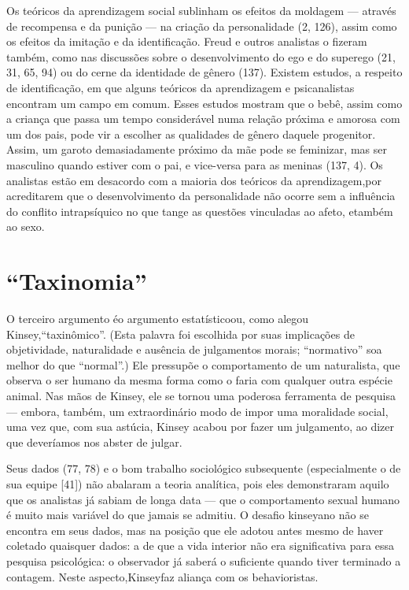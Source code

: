  Os teóricos da aprendizagem social sublinham os efeitos da moldagem ---
através de recompensa e da punição --- na criação da personalidade (2,
126), assim como os efeitos da imitação e da identificação.\idxident{} Freud e
outros analistas o fizeram também, como nas discussões sobre o
desenvolvimento do ego e do superego (21, 31, 65, 94) ou do cerne da
identidade de gênero\idxidencer{} (137). Existem estudos, a respeito de
identificação, em que alguns teóricos da aprendizagem e psicanalistas
encontram um campo em comum. Esses estudos mostram que o bebê, assim
como a criança que passa um tempo considerável numa relação próxima e
amorosa com um dos pais, pode vir a escolher as qualidades de gênero
daquele progenitor. Assim, um garoto demasiadamente próximo da mãe pode
se feminizar, mas ser masculino quando estiver com o pai, e vice-versa
para as meninas (137, 4). Os analistas estão em desacordo com a
maioria dos teóricos da aprendizagem,\idxaberrteor[|)] por acreditarem que o
desenvolvimento da personalidade não ocorre sem a influência do
conflito intrapsíquico no que tange as questões vinculadas ao afeto, e\idxsocia[|)]
também ao sexo.




\section{``Taxinomia''}

O terceiro argumento é\idxestat[|(] o argumento estatístico\idxaberrestat[|(] ou, como alegou
Kinsey,\idxkins[|(] ``taxinômico''. (Esta palavra foi escolhida por suas implicações
de objetividade, naturalidade e ausência de julgamentos morais;
``normativo'' soa melhor do que ``normal''.) Ele pressupõe o comportamento
de um naturalista, que observa o ser humano da mesma forma como o faria
com qualquer outra espécie animal. Nas mãos de Kinsey, ele se tornou
uma poderosa ferramenta de pesquisa --- embora, também, um
extraordinário modo de impor uma moralidade social, uma vez que, com
sua astúcia, Kinsey acabou por fazer um julgamento, ao dizer que
deveríamos nos abster de julgar.

 Seus dados (77, 78) e o bom trabalho sociológico subsequente
(especialmente o de sua equipe [41]) não abalaram a teoria analítica,
pois eles demonstraram aquilo que os analistas já sabiam de longa data
--- que o comportamento sexual humano é muito mais variável do que jamais
se admitiu. O desafio kinseyano não se encontra em seus dados, mas na
posição que ele adotou antes mesmo de haver coletado quaisquer dados: a
de que a vida interior não era significativa para essa pesquisa
psicológica: o observador já saberá o suficiente quando tiver terminado
a contagem. Neste aspecto,\idxestat[|)] Kinsey\idxkins[|)] faz aliança com os behavioristas.




